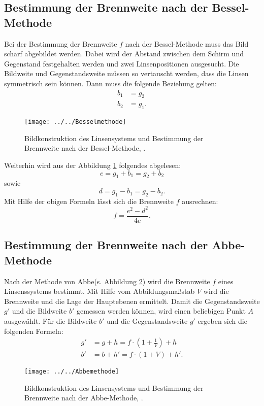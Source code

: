 \subsection{Bestimmung der Brennweite nach der Bessel-Methode}
\label{sec:Bessel}
Bei der Bestimmung der Brennweite $f$ nach der Bessel-Methode muss das Bild scharf abgebildet werden. Dabei wird der Abstand zwischen dem Schirm und Gegenstand festgehalten werden und zwei Linsenpositionen ausgesucht. Die Bildweite und Gegenstandsweite müssen so vertauscht werden, dass die Linsen symmetrisch sein können. Dann muss die folgende Beziehung gelten:
\begin{align*}
b_1 &= g_2 \\
b_2 &= g_1.
\end{align*}
\begin{figure}[h!]
	\centering
	\texttt{[image: ../../Besselmethode]}
	\caption{Bildkonstruktion des Linsensystems und Bestimmung der Brennweite nach der Bessel-Methode, \cite[4]{anleitung408}.}
	\label{fig:besselmethode}
\end{figure}
Weiterhin wird aus der Abbildung \ref{fig:besselmethode} folgendes abgelesen:
\begin{equation*}
e = g_1 + b_1 = g_2 + b_2
\end{equation*}
sowie
\begin{equation*}
d = g_1 - b_1 = g_2 - b_2.
\end{equation*}
Mit Hilfe der obigen Formeln lässt sich die Brennweite $f$ ausrechnen:
\begin{equation}
f = \frac{e^2-d^2}{4e}.
\end{equation}

\subsection{Bestimmung der Brennweite nach der Abbe-Methode}
\label{sec:Abbe}

Nach der Methode von Abbe(s. Abbildung \ref{fig:abbemethode}) wird die Brennweite $f$ eines Linsenssystems bestimmt. Mit Hilfe vom Abbildungsmaßstab $V$ wird die Brennweite und die Lage der Hauptebenen ermittelt. Damit die Gegenstandsweite $g'$ und die Bildweite $b'$ gemessen werden können, wird einen beliebigen Punkt $A$ ausgewählt. Für die Bildweite $b'$ und die Gegenstandsweite $g'$ ergeben sich die folgenden Formeln:
\begin{align}
g' &= g + h = f \cdot \left(1 + \frac{1}{V}\right) + h \\
b' &= b + h'= f \cdot (1 + V) + h'.
\end{align}

\begin{figure}[h!]
	\centering
	\texttt{[image: ../../Abbemethode]}
	\caption{Bildkonstruktion des Linsensystems und Bestimmung der Brennweite nach der Abbe-Methode, \cite[5]{anleitung408}.}
	\label{fig:abbemethode}
\end{figure}
